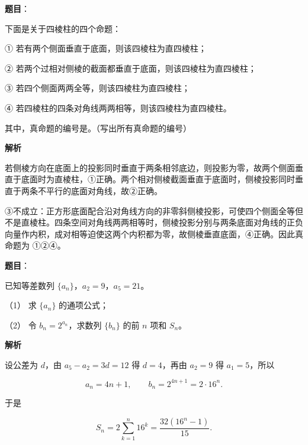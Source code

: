 \begin{answer}

\textbf{题目}：

下面是关于四棱柱的四个命题：

① 若有两个侧面垂直于底面，则该四棱柱为直四棱柱；

② 若两个过相对侧棱的截面都垂直于底面，则该四棱柱为直四棱柱；

③ 若四个侧面两两全等，则该四棱柱为直四棱柱；

④ 若四棱柱的四条对角线两两相等，则该四棱柱为直四棱柱。

其中，真命题的编号是\gkblank{}。（写出所有真命题的编号）

\textbf{解析}

若侧棱方向在底面上的投影同时垂直于两条相邻底边，则投影为零，故两个侧面垂直于底面时为直棱柱，①正确。两个相对侧棱截面垂直于底面时，侧棱投影同时垂直于两条不平行的底面对角线，故②正确。

③不成立：正方形底面配合沿对角线方向的非零斜侧棱投影，可使四个侧面全等但不是直棱柱。四条空间对角线两两相等时，侧棱投影分别与两条底面对角线的正负向量作内积，成对相等迫使这两个内积都为零，故侧棱垂直底面，④正确。因此真命题为 ①②④。


\end{answer}
\begin{answer}

\textbf{题目}：

已知等差数列 $\{a_n\}$，$a_2=9$，$a_5=21$。

（1） 求 $\{a_n\}$ 的通项公式；

（2） 令 $b_n=2^{a_n}$，求数列 $\{b_n\}$ 的前 $n$ 项和 $S_n$。

\textbf{解析}


设公差为 $d$，由 $a_5-a_2=3d=12$ 得 $d=4$，再由 $a_2=9$ 得 $a_1=5$，所以

\nopagebreak[4]
\[
a_n=4n+1,\qquad b_n=2^{4n+1}=2\cdot16^n.
\]


于是

\nopagebreak[4]
\[
S_n=2\sum_{k=1}^n16^k
=\frac{32(16^n-1)}{15}.
\]



\end{answer}
